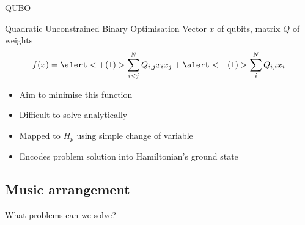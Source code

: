 \documentclass[handout]{beamer}
\begin{document}
\begin{frame}{QUBO}
    \pause
    \begin{block}{Quadratic Unconstrained Binary Optimisation}
        \vspace{0.1em}
        Vector $x$ of qubits, matrix $Q$ of weights
        \begin{equation*}
            f(x)=\alert<+(1)>{\sum^N_{i<j}Q_{i,j}x_ix_j} + \alert<+(1)>{\sum^N_iQ_{i,i}x_i}
        \end{equation*}
    \end{block}
    \pause
    \begin{itemize}
        \item Aim to minimise this function
        \item Difficult to solve analytically
        \item Mapped to $H_p$ using simple change of variable
        \item Encodes problem solution into Hamiltonian's ground state
    \end{itemize}

\end{frame}

\subsection{Music arrangement}

\begin{frame}[standout]
    What problems can we solve?

\end{frame}
\end{document}
